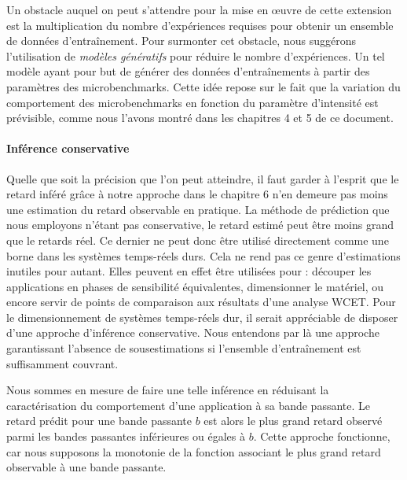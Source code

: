 Un obstacle auquel on peut s'attendre pour la mise en œuvre de cette extension est la multiplication du nombre d'expériences requises pour obtenir un ensemble de données d'entraînement.
Pour surmonter cet obstacle, nous suggérons l'utilisation de \emph{modèles génératifs} pour réduire le nombre d'expériences.
Un tel modèle ayant pour but de générer des données d'entraînements à partir des paramètres des microbenchmarks.
Cette idée repose sur le fait que la variation du comportement des microbenchmarks en fonction du paramètre d'intensité est prévisible, comme nous l'avons montré dans les chapitres 4 et 5 de ce document.


\paragraph{Inférence conservative}
Quelle que soit la précision que l'on peut atteindre, il faut garder à l'esprit que le retard inféré grâce à notre approche dans le chapitre 6 n'en demeure pas moins une estimation du retard observable en pratique.
La méthode de prédiction que nous employons n'étant pas conservative, le retard estimé peut être moins grand que le retards réel.
Ce dernier ne peut donc être utilisé directement comme une borne dans les systèmes temps-réels durs.
Cela ne rend pas ce genre d'estimations inutiles pour autant.
Elles peuvent en effet être utilisées pour : découper les applications en phases de sensibilité équivalentes, dimensionner le matériel, ou encore servir de points de comparaison aux résultats d'une analyse WCET.
Pour le dimensionnement de systèmes temps-réels dur, il serait appréciable de disposer d'une approche d'inférence conservative.
Nous entendons par là une approche garantissant l'absence de sousestimations si l'ensemble d'entraînement est suffisamment couvrant.

Nous sommes en mesure de faire une telle inférence en réduisant la caractérisation du comportement d'une application à sa bande passante.
Le retard prédit pour une bande passante $b$ est alors le plus grand retard observé parmi les bandes passantes inférieures ou égales à $b$.
Cette approche fonctionne, car nous supposons la monotonie de la fonction associant le plus grand retard observable à une bande passante.

